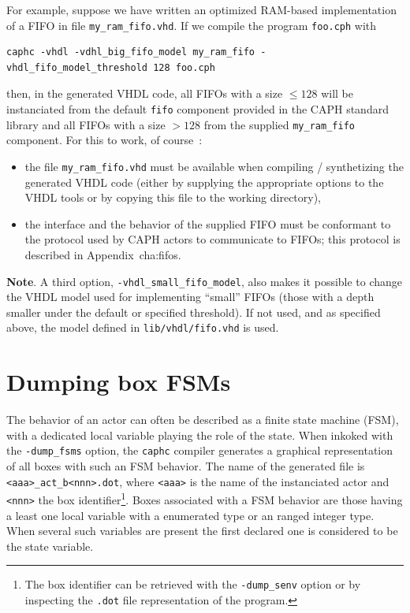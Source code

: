 For example, suppose we have written an optimized RAM-based implementation of a FIFO in file
\verb|my_ram_fifo.vhd|. If we compile the program \texttt{foo.cph} with 
\begin{verbatim}
caphc -vhdl -vdhl_big_fifo_model my_ram_fifo -vhdl_fifo_model_threshold 128 foo.cph
\end{verbatim}
then, in the generated VHDL code, all FIFOs with a size $\leq 128$ will be instanciated from the
default \verb|fifo| component provided in the CAPH standard library  and all FIFOs with a size
$>128$ from the supplied \verb|my_ram_fifo| component. For this to work, of course~:
\begin{itemize}
\item the file \verb|my_ram_fifo.vhd| must be available when compiling / synthetizing the generated
  VHDL code (either by supplying the appropriate options to the VHDL tools or by copying this file
  to the working directory),
\item the interface and the behavior of the supplied FIFO must be conformant to the protocol used by
  CAPH actors to communicate to FIFOs; this protocol is described in Appendix~{cha:fifos}. 
\end{itemize}

\medskip
\textbf{Note}. A third option, \verb|-vhdl_small_fifo_model|, also makes it possible to change the
VHDL model used for implementing ``small'' FIFOs (those with a depth smaller under the default or
specified threshold). If not used, and as specified above, the model defined in
\verb|lib/vhdl/fifo.vhd| is used.

\section{Dumping box FSMs}
\label{sec:dumping-box-fsm}

The behavior of an actor can often be described as a finite state machine (FSM), with a dedicated
local variable playing the role of the state.
When inkoked with the \verb|-dump_fsms| option, the \verb|caphc| compiler generates a graphical
representation of all boxes with such an FSM behavior. The name of the generated file is
\verb|<aaa>_act_b<nnn>.dot|, where \verb|<aaa>| is the name of the instanciated actor and
\verb|<nnn>| the box identifier\footnote{The box identifier can be retrieved with the
  \texttt{-dump\_senv} option or by inspecting the \texttt{.dot} file representation of the
  program.}. Boxes associated with a FSM behavior are those having a least one local variable with a
enumerated type or an ranged integer type. When several such variables are present the first
declared one is considered to be the state variable.

